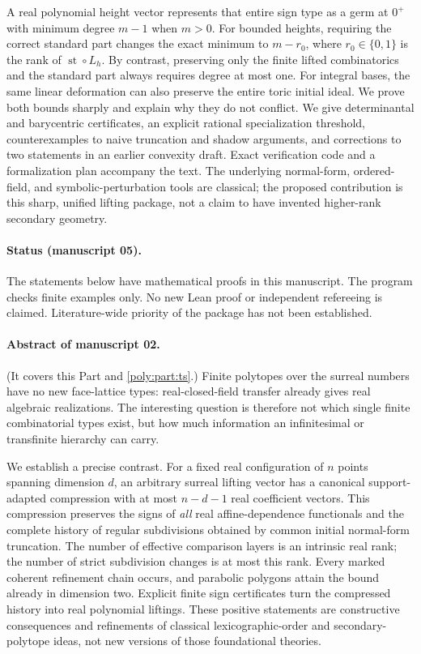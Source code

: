 \documentclass[11pt,a4paper]{article}
\numberwithin{equation}{section}
\theoremstyle{plain}
\newcommand{\st}{\operatorname{st}}
\begin{document}
A real polynomial height vector represents that entire sign type as a germ
at $0^+$ with minimum degree $m-1$ when $m>0$. For bounded heights, requiring
the correct standard part changes the exact minimum to $m-r_0$, where
$r_0\in\{0,1\}$ is the rank of $\st\circ L_h$. By contrast, preserving only
the finite lifted combinatorics and the standard part always requires degree
at most one. For integral bases, the same linear deformation can also
preserve the entire toric initial ideal. We prove both bounds sharply and explain why they do not
conflict. We give determinantal and barycentric certificates, an explicit
rational specialization threshold, counterexamples to naive truncation and
shadow arguments, and corrections to two statements in an earlier convexity
draft. Exact verification code and a formalization plan accompany the text.
The underlying normal-form, ordered-field, and symbolic-perturbation tools
are classical; the proposed contribution is this sharp, unified lifting
package, not a claim to have invented higher-rank secondary geometry.

\paragraph{Status (manuscript 05).}
The statements below have mathematical proofs in
this manuscript. The program checks finite examples only. No new Lean proof
or independent refereeing is claimed. Literature-wide priority of the
package has not been established.

\paragraph{Abstract of manuscript 02.} (It covers this Part and
\cref{poly:part:ts}.)
Finite polytopes over the surreal numbers have no new face-lattice types:
real-closed-field transfer already gives real algebraic realizations. The
interesting question is therefore not which single finite combinatorial types
exist, but how much information an infinitesimal or transfinite hierarchy can
carry.

We establish a precise contrast. For a fixed real configuration of $n$ points
spanning dimension $d$, an arbitrary surreal lifting vector has a canonical
support-adapted compression with at most $n-d-1$ real coefficient vectors.
This compression preserves the signs of \emph{all} real affine-dependence
functionals and the complete history of regular subdivisions obtained by
common initial normal-form truncation. The number of effective comparison
layers is an intrinsic real rank; the number of strict subdivision changes
is at most this rank. Every marked coherent refinement chain occurs, and
parabolic polygons attain the bound already in dimension two. Explicit finite
sign certificates turn the compressed history into real polynomial liftings.
These positive statements are constructive consequences and refinements of
classical lexicographic-order and secondary-polytope ideas, not new versions
of those foundational theories.
\end{document}
